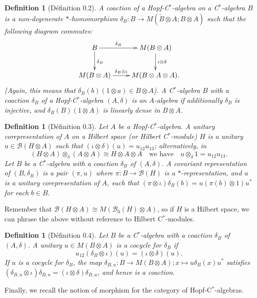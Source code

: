 \documentclass[a4paper,12pt]{article}
\theoremstyle{plain}
\newtheorem{definition}[proposition]{Definition}
\theoremstyle{definition}
\newcommand{\mc}{\mathcal}
\newcommand{\unit}[1]{\tilde{#1}}
\begin{document}
\begin{definition}[D\'efinition 0.2]
A \emph{coaction} of a Hopf-C$^*$-algebra on a C$^*$-algebra $B$ is a
non-degenerate $*$-homomorphism $\delta_B:B\rightarrow M(\unit{B}\otimes A;
B\otimes A)$ such that the following diagram commutes:
\[ \xymatrix{ B \ar[r]^-{\delta_B} \ar[d]^{\delta_B} & M(B\otimes A)
\ar[d]^{\iota\otimes\delta} \\ M(B\otimes A) \ar[r]^-{\delta_B\otimes\iota}
& M(B\otimes A\otimes A). } \]
(Again, this means that $\delta_B(b)(1\otimes a) \in B\otimes A$).
A C$^*$-algebra $B$ with a coaction $\delta_B$ of a Hopf-C$^*$-algebra
$(A,\delta)$ is an \emph{$A$-algebra} if additionally $\delta_B$ is injective,
and $\delta_B(B)(1\otimes A)$ is linearly dense in $B\otimes A$.
\end{definition}

\begin{definition}[D\'efinition 0.3]
Let $A$ be a Hopf-C$^*$-algebra.  A \emph{unitary corepresentation} of $A$ on a
Hilbert space (or Hilbert C$^*$-module) $H$ is a unitary $u\in\mc B(H\otimes A)$
such that $(\iota\otimes\delta)(u) = u_{12} u_{13}$; alternatively, in
\[ (H\otimes A)\otimes_\delta (A\otimes A) \cong H\otimes A\otimes A
\quad\text{we have}\quad u\otimes_\delta 1 = u_{12} u_{13}. \]
Let $B$ be a C$^*$-algebra with a coaction $\delta_B$ of $(A,\delta)$.
A \emph{covariant representation} of $(B,\delta_B)$ is a pair $(\pi,u)$ where
$\pi:B\rightarrow\mc B(H)$ is a $*$-representation, and $u$ is a unitary
corepresentation of $A$, such that $(\pi\otimes\iota)\delta_B(b)
= u(\pi(b)\otimes 1)u^*$ for each $b\in B$.
\end{definition}

Remember that $\mc B(H\otimes A) \cong M(\mc B_0(H)\otimes A)$, so if $H$ is
a Hilbert space, we can phrase the above without reference to Hilbert C$^*$-modules.

\begin{definition}[D\'efinition 0.4]
Let $B$ be a C$^*$-algebra with a coaction $\delta_B$ of $(A,\delta)$.
A unitary $u\in M(B\otimes A)$ is a \emph{cocycle for $\delta_B$} if
\[ u_{12} (\delta_B\otimes\iota)(u) = (\iota\otimes\delta)(u). \]
If $u$ is a cocycle for $\delta_B$, the map $\delta_{B,u}:B\rightarrow
M(B\otimes A); x\mapsto u \delta_B(x) u^*$ satisfies $(\delta_{B,u}\otimes\iota)
\delta_{B,u} = (\iota\otimes\delta)\delta_{B,u}$, and hence is a coaction.
\end{definition}

Finally, we recall the notion of morphism for the category of Hopf-C$^*$-algebras.
\end{document}
